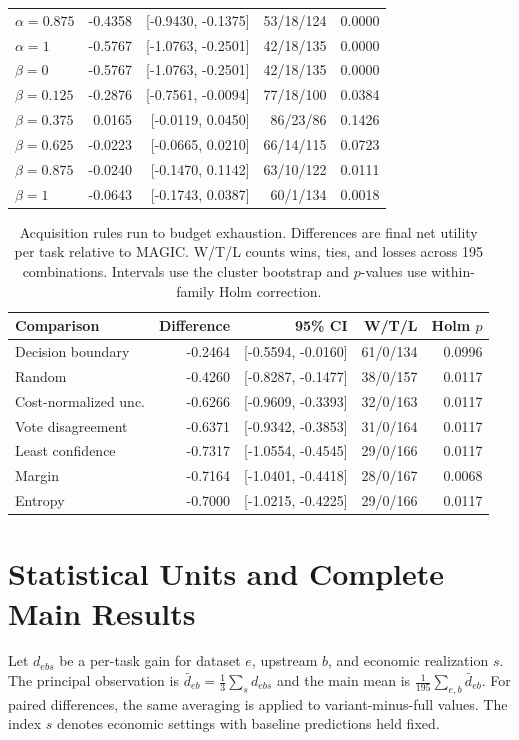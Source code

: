 \documentclass[journal]{IEEEtran}
\newcommand{\smalltable}{\footnotesize\setlength{\tabcolsep}{3.5pt}}
\begin{document}
\begin{table}[t]
\begin{tabular}{lrrrr}
$\alpha=0.875$ & -0.4358 & [-0.9430, -0.1375] & 53/18/124 & 0.0000 \\
$\alpha=1$ & -0.5767 & [-1.0763, -0.2501] & 42/18/135 & 0.0000 \\
$\beta=0$ & -0.5767 & [-1.0763, -0.2501] & 42/18/135 & 0.0000 \\
$\beta=0.125$ & -0.2876 & [-0.7561, -0.0094] & 77/18/100 & 0.0384 \\
$\beta=0.375$ & 0.0165 & [-0.0119, 0.0450] & 86/23/86 & 0.1426 \\
$\beta=0.625$ & -0.0223 & [-0.0665, 0.0210] & 66/14/115 & 0.0723 \\
$\beta=0.875$ & -0.0240 & [-0.1470, 0.1142] & 63/10/122 & 0.0111 \\
$\beta=1$ & -0.0643 & [-0.1743, 0.0387] & 60/1/134 & 0.0018 \\
\bottomrule
\end{tabular}

\end{table}

\begin{table}[t]
\caption{Acquisition rules run to budget exhaustion. Differences are final net utility per task relative to MAGIC. W/T/L counts wins, ties, and losses across 195 combinations. Intervals use the cluster bootstrap and $p$-values use within-family Holm correction.}
\label{tab:paired}\centering\smalltable\setlength{\tabcolsep}{2pt}
\begin{tabular}{lrrrr}
\toprule
Comparison & Difference & 95\% CI & W/T/L & Holm $p$ \\
\midrule
Decision boundary & -0.2464 & [-0.5594, -0.0160] & 61/0/134 & 0.0996 \\
Random & -0.4260 & [-0.8287, -0.1477] & 38/0/157 & 0.0117 \\
Cost-normalized unc. & -0.6266 & [-0.9609, -0.3393] & 32/0/163 & 0.0117 \\
Vote disagreement & -0.6371 & [-0.9342, -0.3853] & 31/0/164 & 0.0117 \\
Least confidence & -0.7317 & [-1.0554, -0.4545] & 29/0/166 & 0.0117 \\
Margin & -0.7164 & [-1.0401, -0.4418] & 28/0/167 & 0.0068 \\
Entropy & -0.7000 & [-1.0215, -0.4225] & 29/0/166 & 0.0117 \\
\bottomrule
\end{tabular}

\end{table}

\section{Statistical Units and Complete Main Results}
\label{app:statistics}
Let $d_{ebs}$ be a per-task gain for dataset $e$, upstream $b$, and economic realization $s$. The principal observation is $\bar d_{eb}=\frac13\sum_s d_{ebs}$ and the main mean is $\frac1{195}\sum_{e,b}\bar d_{eb}$. For paired differences, the same averaging is applied to variant-minus-full values. The index $s$ denotes economic settings with baseline predictions held fixed.
\end{document}
